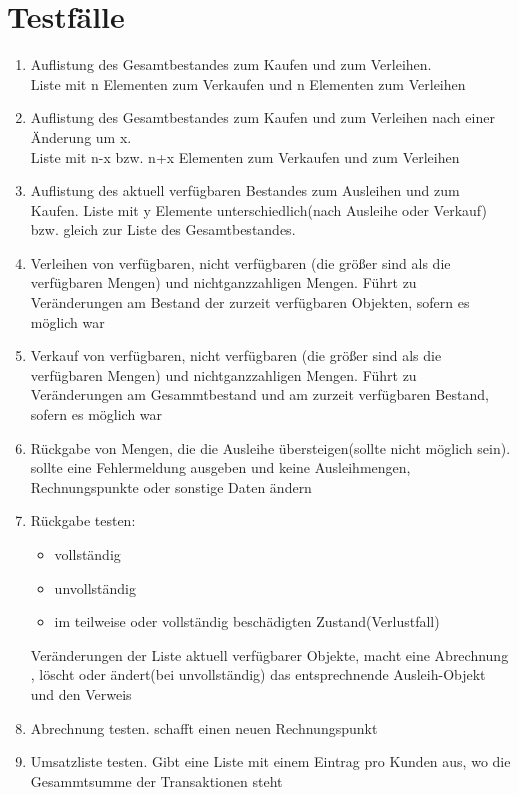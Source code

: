\documentclass[a4paper,12pt,titlepage]{article}
\begin{document}
\part{Testfälle}
\begin{enumerate}
\item
Auflistung des Gesamtbestandes zum Kaufen und zum Verleihen.\\
\Rightarrow Liste mit n Elementen zum Verkaufen und n Elementen zum Verleihen
\item
Auflistung des Gesamtbestandes zum Kaufen und zum Verleihen nach einer Änderung um x.\\
\Rightarrow Liste mit n-x bzw. n+x Elementen zum Verkaufen und zum Verleihen
\item
Auflistung des aktuell verfügbaren Bestandes zum Ausleihen und zum Kaufen.
\Rightarrow Liste mit y Elemente unterschiedlich(nach Ausleihe oder Verkauf) bzw. gleich zur Liste des Gesamtbestandes. 
\item
Verleihen von verfügbaren, nicht verfügbaren (die größer sind als die verfügbaren Mengen) und nichtganzzahligen Mengen.
\Rightarrow Führt zu Veränderungen am Bestand der zurzeit verfügbaren Objekten, sofern es möglich war 
\item
Verkauf von verfügbaren, nicht verfügbaren (die größer sind als die verfügbaren Mengen) und nichtganzzahligen Mengen.
\Rightarrow Führt zu Veränderungen am Gesammtbestand und am zurzeit verfügbaren Bestand, sofern es möglich war
\item
Rückgabe von Mengen, die die Ausleihe übersteigen(sollte nicht möglich sein).
\Rightarrow sollte eine Fehlermeldung ausgeben und keine Ausleihmengen, Rechnungspunkte oder sonstige Daten ändern
\item
Rückgabe testen:
\begin{itemize}
\item vollständig
\item unvollständig 
\item im teilweise oder vollständig beschädigten Zustand(Verlustfall)
\end{itemize}
\Rightarrow Veränderungen der Liste aktuell verfügbarer Objekte, macht eine Abrechnung , löscht oder ändert(bei unvollständig) das entsprechnende Ausleih-Objekt und den Verweis
\item
Abrechnung testen.
\Rightarrow schafft einen neuen Rechnungspunkt
\item
Umsatzliste testen.
\Rightarrow Gibt eine Liste mit einem Eintrag pro Kunden aus, wo die Gesammtsumme der Transaktionen steht

\end{enumerate}
\end{document}
